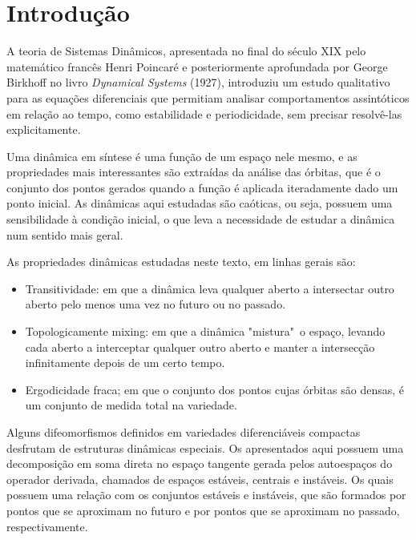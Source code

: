 %

\chapter*{Introdução}

 

A teoria de Sistemas Dinâmicos, apresentada no final do século XIX pelo matemático francês Henri Poincaré e posteriormente aprofundada por George Birkhoff no livro \textit{Dynamical Systems} (1927), introduziu um estudo qualitativo para as equações diferenciais que permitiam analisar comportamentos assintóticos em relação ao tempo, como estabilidade e periodicidade, sem precisar resolvê-las explicitamente.

Uma dinâmica em síntese é uma função de um espaço nele mesmo, e as propriedades mais interessantes são extraídas da análise das órbitas, que é o conjunto dos pontos gerados quando a função é aplicada iteradamente dado um ponto inicial. As dinâmicas aqui estudadas são caóticas, ou seja, possuem uma sensibilidade à condição inicial, o que leva a necessidade de estudar a dinâmica num sentido mais geral.

As propriedades dinâmicas estudadas neste texto, em linhas gerais são:
\vspace{-0.2cm}\begin{itemize}
\item Transitividade: em que a dinâmica leva qualquer aberto a intersectar outro aberto pelo menos uma vez no futuro ou no passado.
\vspace{-0.4cm}\item Topologicamente mixing: em que a dinâmica "mistura"\ o espaço, levando cada aberto a interceptar qualquer outro aberto e manter a intersecção infinitamente depois de um certo tempo.
\vspace{-0.4cm}\item Ergodicidade fraca; em que o conjunto dos pontos cujas órbitas são densas, é um conjunto de medida total na variedade.
\end{itemize}

Alguns difeomorfismos definidos em variedades diferenciáveis compactas desfrutam de estruturas dinâmicas especiais. Os apresentados aqui possuem uma decomposição em soma direta no espaço tangente gerada pelos autoespaços do operador derivada, chamados de espaços estáveis, centrais e instáveis. Os quais possuem uma relação com os conjuntos estáveis e instáveis, que são formados por pontos que se aproximam no futuro e por pontos que se aproximam no passado, respectivamente. 

